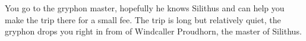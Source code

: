 
You go to the gryphon master, hopefully he knows Silithus and can help you make the trip there for a small fee. The trip is long but relatively quiet, the gryphon drops you right in from of Windcaller Proudhorn, the master of Silithus.


